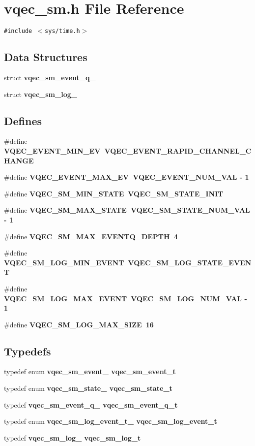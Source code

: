 \section{vqec\_\-sm.h File Reference}
\label{vqec__sm_8h}
{\tt \#include $<$sys/time.h$>$}\par
\subsection*{Data Structures}
\begin{CompactItemize}
\item 
struct \bf{vqec\_\-sm\_\-event\_\-q\_\-}
\item 
struct \bf{vqec\_\-sm\_\-log\_\-}
\end{CompactItemize}
\subsection*{Defines}
\begin{CompactItemize}
\item 
\#define \bf{VQEC\_\-EVENT\_\-MIN\_\-EV}~VQEC\_\-EVENT\_\-RAPID\_\-CHANNEL\_\-CHANGE
\item 
\#define \bf{VQEC\_\-EVENT\_\-MAX\_\-EV}~VQEC\_\-EVENT\_\-NUM\_\-VAL - 1
\item 
\#define \bf{VQEC\_\-SM\_\-MIN\_\-STATE}~VQEC\_\-SM\_\-STATE\_\-INIT
\item 
\#define \bf{VQEC\_\-SM\_\-MAX\_\-STATE}~VQEC\_\-SM\_\-STATE\_\-NUM\_\-VAL - 1
\item 
\#define \bf{VQEC\_\-SM\_\-MAX\_\-EVENTQ\_\-DEPTH}~4
\item 
\#define \bf{VQEC\_\-SM\_\-LOG\_\-MIN\_\-EVENT}~VQEC\_\-SM\_\-LOG\_\-STATE\_\-EVENT
\item 
\#define \bf{VQEC\_\-SM\_\-LOG\_\-MAX\_\-EVENT}~VQEC\_\-SM\_\-LOG\_\-NUM\_\-VAL - 1
\item 
\#define \bf{VQEC\_\-SM\_\-LOG\_\-MAX\_\-SIZE}~16
\end{CompactItemize}
\subsection*{Typedefs}
\begin{CompactItemize}
\item 
typedef enum \bf{vqec\_\-sm\_\-event\_\-} \bf{vqec\_\-sm\_\-event\_\-t}
\item 
typedef enum \bf{vqec\_\-sm\_\-state\_\-} \bf{vqec\_\-sm\_\-state\_\-t}
\item 
typedef \bf{vqec\_\-sm\_\-event\_\-q\_\-} \bf{vqec\_\-sm\_\-event\_\-q\_\-t}
\item 
typedef enum \bf{vqec\_\-sm\_\-log\_\-event\_\-t\_\-} \bf{vqec\_\-sm\_\-log\_\-event\_\-t}
\item 
typedef \bf{vqec\_\-sm\_\-log\_\-} \bf{vqec\_\-sm\_\-log\_\-t}
\end{CompactItemize}
